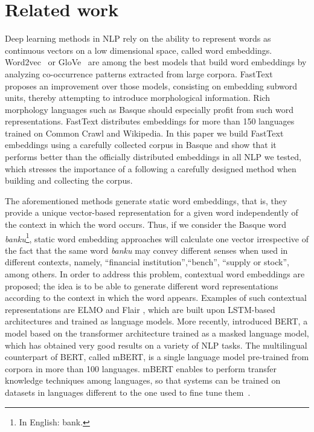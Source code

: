 \documentclass[10pt, a4paper]{article}
\begin{document}

\section{Related work}\label{sec:related-work}


Deep learning methods in NLP rely on the ability to represent words as continuous vectors on a low dimensional space, called word embeddings. Word2vec~\cite{mikolov2013distributed} or GloVe~\cite{Pennington14glove:global} are among the best models that build word embeddings by analyzing co-occurrence patterns extracted from large corpora. FastText~\cite{fasttext1_bojanowski2017enriching} proposes an improvement over those models, consisting on embedding subword units, thereby attempting to introduce morphological information. Rich morphology languages such as Basque should especially profit from such word representations. FastText distributes embeddings for more than 150 languages trained on Common Crawl and  Wikipedia. In this paper we build FastText embeddings using a carefully collected corpus in Basque and show that it performs better than the officially distributed embeddings in all NLP we tested, which stresses the importance of a following a carefully designed method when building and collecting the corpus.

The aforementioned methods generate static word embeddings, that is, they provide a unique vector-based representation for a given word independently of the context in which the word occurs. Thus, if we consider the Basque word \emph{banku}\footnote{In English: bank.}, static word embedding approaches will calculate one vector irrespective of the fact that the same word \emph{banku} may convey different senses when used in different contexts, namely, ``financial institution'',``bench'', ``supply or stock'', among others. In order to address this problem, contextual word embeddings are proposed; the idea is to be able to generate different word representations according to the context in which the word appears. Examples of such contextual representations are ELMO \cite{Peters:2018} and Flair \cite{akbik2018coling}, which are built upon LSTM-based architectures and trained as language models. More recently,  introduced BERT, a model based on the transformer architecture trained as a masked language model, which has obtained very good results on a variety of NLP tasks. The multilingual counterpart of BERT, called mBERT, is a single language model pre-trained from corpora in more than 100 languages. mBERT enables to perform transfer knowledge techniques among languages, so that systems can be trained on datasets in languages different to the one used to fine tune them~\cite{heinzerling-strube-2019-sequence,DBLP:conf/acl/PiresSG19}.
\end{document}
